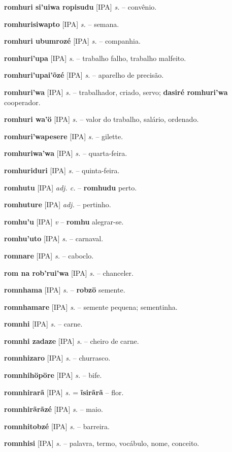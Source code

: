 \textbf{romhuri si'uiwa ropisudu} [IPA] \textit{s.} -- convênio.

\textbf{romhurisiwapto} [IPA] \textit{s.} -- semana.

\textbf{romhuri ubumrozé} [IPA] \textit{s.} -- companhia.

\textbf{romhuri'upa} [IPA] \textit{s.} -- trabalho falho, trabalho malfeito.

\textbf{romhuri'upai'õzé} [IPA] \textit{s.} -- aparelho de precisão.

\textbf{romhuri'wa} [IPA] \textit{s.} -- trabalhador, criado, servo; \textbf{dasiré romhuri'wa} cooperador.

\textbf{romhuri wa'ö} [IPA] \textit{s.} -- valor do trabalho, salário, ordenado.

\textbf{romhuri'wapesere} [IPA] \textit{s.} -- gilette.

\textbf{romhuriwa'wa} [IPA] \textit{s.} -- quarta-feira.

\textbf{romhuriduri} [IPA] \textit{s.} -- quinta-feira.

\textbf{romhutu} [IPA] \textit{adj. c.} -- \textbf{romhudu} perto.

\textbf{romhuture} [IPA] \textit{adj.} -- pertinho.

\textbf{romhu'u} [IPA] \textit{v} -- \textbf{romhu} alegrar-se.

\textbf{romhu'uto} [IPA] \textit{s.} -- carnaval.

\textbf{romnare} [IPA] \textit{s.} -- caboclo.

\textbf{rom na rob'rui'wa} [IPA] \textit{s.} -- chanceler.

\textbf{romnhama} [IPA] \textit{s.} -- \textbf{robzö} semente.

\textbf{romnhamare} [IPA] \textit{s.} -- semente pequena; sementinha.

\textbf{romnhi} [IPA] \textit{s.} -- carne.

\textbf{romnhi zadaze} [IPA] \textit{s.} -- cheiro de carne.

\textbf{romnhizaro} [IPA] \textit{s.} -- churrasco.

\textbf{romnhihöpöre} [IPA] \textit{s.} -- bife.

\textbf{romnhirarã} [IPA] \textit{s.} = \textbf{ĩsirãrã} -- flor.

\textbf{romnhirãrãzé} [IPA] \textit{s.} -- maio.

\textbf{romnhitobzé} [IPA] \textit{s.} -- barreira.

\textbf{romnhisi} [IPA] \textit{s.} -- palavra, termo, vocábulo, nome, conceito.

